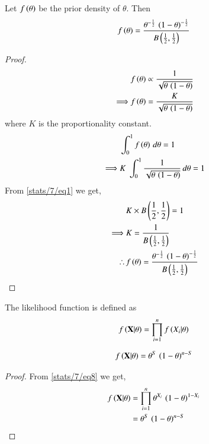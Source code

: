     \begin{lemma}
        Let $f\left(\theta\right)$ be the prior density of $\theta$.  Then 
    \begin{align}
        f\left(\theta\right) = \frac{\theta^{-\frac{1}{2}}\,\left(1-\theta\right)^{-\frac{1}{2}}}{B\left(\frac{1}{2},\frac{1}{2}\right)}\label{stats/7/eq6}
    \end{align}
    \end{lemma}
    \begin{proof}
    \begin{align}
        &f\left(\theta\right) \propto \frac{1}{\sqrt{\theta\,\left(1-\theta\right)}}\nonumber\\
        \implies &f\left(\theta\right) = \frac{K}{\sqrt{\theta\,\left(1-\theta\right)}}
    \end{align}
    where $K$ is the proportionality constant.
    \begin{align}
        &\int_0^1 f\left(\theta\right)\,d\theta = 1\nonumber\\
        \implies &K\;\int_0^1 \frac{1}{\sqrt{\theta\,\left(1-\theta\right)}}\,d\theta =1
    \end{align}
    From \eqref{stats/7/eq1} we get,
    \begin{align}
        &K\times B\left(\frac{1}{2},\frac{1}{2}\right) = 1\nonumber\\
        \implies &K = \frac{1}{B\left(\frac{1}{2},\frac{1}{2}\right)}\\
        \therefore\, &f\left(\theta\right) = \frac{\theta^{-\frac{1}{2}}\,\left(1-\theta\right)^{-\frac{1}{2}}}{B\left(\frac{1}{2},\frac{1}{2}\right)}
    \end{align}
    \end{proof}
    \begin{definition}
    The likelihood function is defined as 
    \begin{align}
        f\left(\mathbf{X}|\theta\right) = \prod_{i=1}^n f\left(X_i|\theta\right)\label{stats/7/eq8}
    \end{align}
    \end{definition}
    \begin{lemma}
    \begin{align}
        f\left(\mathbf{X}|\theta\right)=\theta^S\,\left(1-\theta\right)^{n-S}\label{stats/7/eq7}
    \end{align}
    \end{lemma}
    \begin{proof}
    From \eqref{stats/7/eq8} we get,
    \begin{align}
        f\left(\mathbf{X}|\theta\right) &= \prod_{i=1}^n\theta^{X_i}\,\left(1-\theta\right)^{1-X_i}\nonumber\\
        &=\theta^S\,\left(1-\theta\right)^{n-S}
    \end{align}
    \end{proof}
